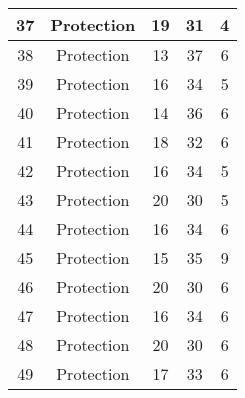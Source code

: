 \documentclass[results.tex]{subfiles}
\begin{document}
\begin{center}
\begin{tabular}{| c || c | c | c | c |}
            \hline
            37                      & Protection                   & 19                     & 31                      & 4                    \\
            \hline
            38                      & Protection                   & 13                     & 37                      & 6                    \\
            \hline
            39                      & Protection                   & 16                     & 34                      & 5                    \\
            \hline
            40                      & Protection                   & 14                     & 36                      & 6                    \\
            \hline
            41                      & Protection                   & 18                     & 32                      & 6                    \\
            \hline
            42                      & Protection                   & 16                     & 34                      & 5                    \\
            \hline
            43                      & Protection                   & 20                     & 30                      & 5                    \\
            \hline
            44                      & Protection                   & 16                     & 34                      & 6                    \\
            \hline
            45                      & Protection                   & 15                     & 35                      & 9                    \\
            \hline
            46                      & Protection                   & 20                     & 30                      & 6                    \\
            \hline
            47                      & Protection                   & 16                     & 34                      & 6                    \\
            \hline
            48                      & Protection                   & 20                     & 30                      & 6                    \\
            \hline
            49                      & Protection                   & 17                     & 33                      & 6                    \\
            \hline
        \end{tabular}
    \end{center}
\end{document}
